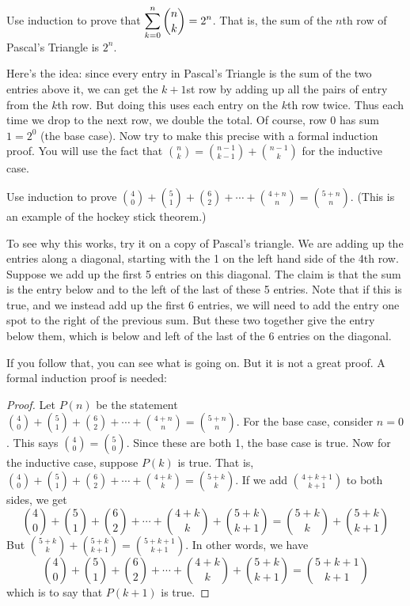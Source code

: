 \begin{questions}
\begin{answer}
	\end{answer}
	

	
\question Use induction to prove that $\displaystyle\sum_{k=0}^n {n \choose k} = 2^n$.  That is, the sum of the $n$th row of Pascal's Triangle is $2^n$.

	\begin{answer}
		Here's the idea: since every entry in Pascal's Triangle is the sum of the two entries above it, we can get the $k+1$st row by adding up all the pairs of entry from the $k$th row.  But doing this uses each entry on the $k$th row twice.  Thus each time we drop to the next row, we double the total.  Of course, row 0 has sum $1 = 2^0$ (the base case).  Now try to make this precise with a formal induction proof.  You will use the fact that ${n \choose k} = {n-1 \choose k-1} + {n-1 \choose k}$ for the inductive case.
	\end{answer}
	
\question Use induction to prove ${4 \choose 0} + {5 \choose 1} + {6 \choose 2} + \cdots + {4+n \choose n} = {5+n \choose n}$.  (This is an example of the hockey stick theorem.)

	\begin{answer}
		To see why this works, try it on a copy of Pascal's triangle.  We are adding up the entries along a diagonal, starting with the 1 on the left hand side of the 4th row.  Suppose we add up the first 5 entries on this diagonal.  The claim is that the sum is the entry below and to the left of the last of these 5 entries.  Note that if this is true, and we instead add up the first 6 entries, we will need to add the entry one spot to the right of the previous sum.  But these two together give the entry below them, which is below and left of the last of the 6 entries on the diagonal.
		
		If you follow that, you can see what is going on.  But it is not a great proof.  A formal induction proof is needed:
		
		\begin{proof}
			Let $P(n)$ be the statement ${4 \choose 0} + {5 \choose 1} + {6 \choose 2} + \cdots + {4+n \choose n} = {5+n \choose n}$.  For the base case, consider $n = 0$.  This says ${4 \choose 0} = {5 \choose 0}$.  Since these are both 1, the base case is true.  Now for the inductive case, suppose $P(k)$ is true.  That is, ${4 \choose 0} + {5 \choose 1} + {6 \choose 2} + \cdots + {4+k \choose k} = {5+k \choose k}$.  If we add ${4+k+1 \choose k+1}$ to both sides, we get \[{4 \choose 0} + {5 \choose 1} + {6 \choose 2} + \cdots + {4+k \choose k} + {5+k \choose k+1}= {5+k \choose k} + {5+k \choose k+1}\]
			But ${5+k \choose k} + {5+k \choose k+1} = {5+k+1 \choose k+1}$.  In other words, we have
			\[{4 \choose 0} + {5 \choose 1} + {6 \choose 2} + \cdots + {4+k \choose k} + {5+k \choose k+1} = {5+k+1 \choose k+1}\]
			which is to say that $P(k+1)$ is true.
			

\end{proof}
\end{answer}
\end{questions}
